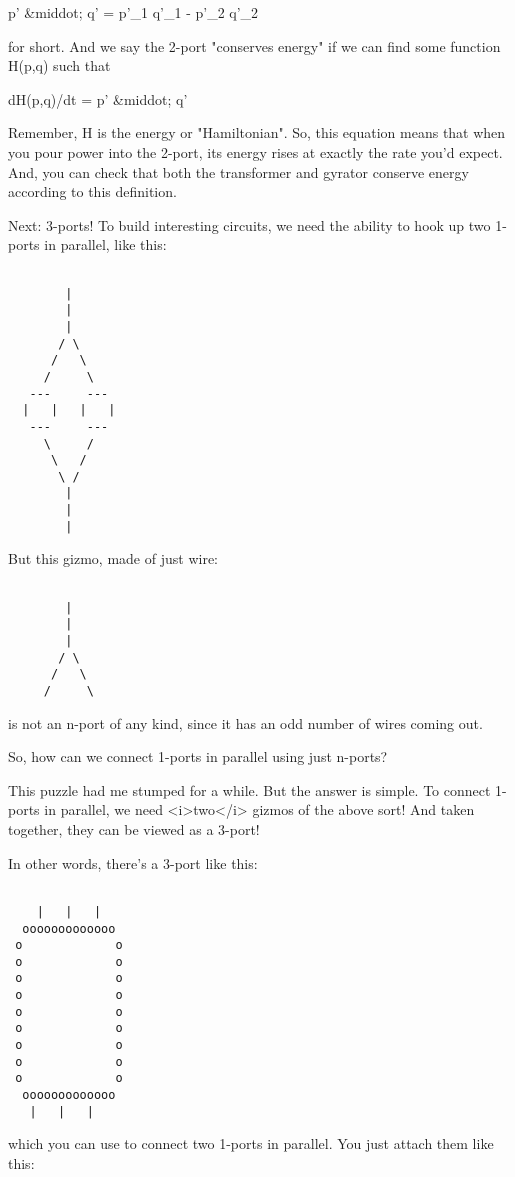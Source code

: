 p' &middot; q' = p'_{1} q'_{1} - p'_{2} q'_{2}

for short.  And we say the 2-port "conserves energy" if we can find 
some function H(p,q) such that

dH(p,q)/dt = p' &middot; q'

Remember, H is the energy or "Hamiltonian".  So, this equation means
that when you pour power into the 2-port, its energy rises at exactly
the rate you'd expect.  And, you can check that both the transformer
and gyrator conserve energy according to this definition.

Next: 3-ports!  To build interesting circuits, we need the ability to
hook up two 1-ports in parallel, like this:


\begin{verbatim}

        |
        |
        |
       / \
      /   \
     /     \
   ---     ---
  |   |   |   |
   ---     ---
     \     /
      \   /
       \ /
        |
        |
        |
\end{verbatim}
    
But this gizmo, made of just wire:


\begin{verbatim}

        |
        |
        |
       / \
      /   \
     /     \

\end{verbatim}
    
is not an n-port of any kind, since it has an odd number of wires
coming out.

So, how can we connect 1-ports in parallel using just n-ports?

This puzzle had me stumped for a while.  But the answer is simple.  To
connect 1-ports in parallel, we need <i>two</i> gizmos of the above
sort!  And taken together, they can be viewed as a 3-port!

In other words, there's a 3-port like this:


\begin{verbatim}

    |   |   |
  ooooooooooooo
 o             o
 o             o
 o             o
 o             o
 o             o
 o             o
 o             o
 o             o
 o             o
  ooooooooooooo
   |   |   |
\end{verbatim}
    

which you can use to connect two 1-ports in parallel.  You just attach
them like this:


